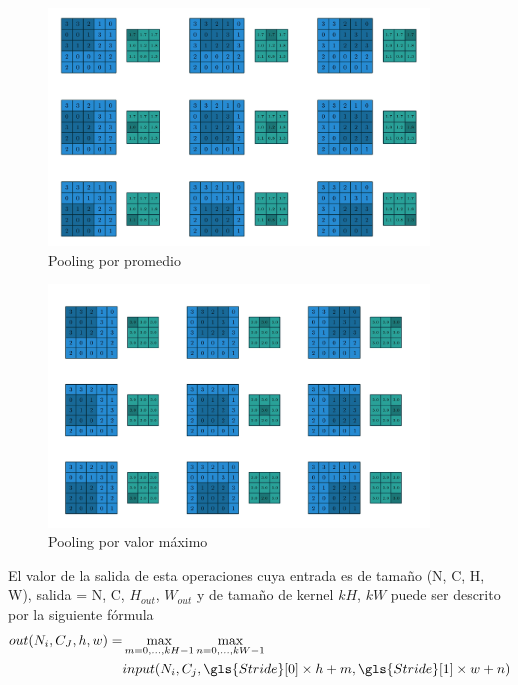 \begin{figure}[H]
    \centering
    \includegraphics[width =0.9\textwidth]{images/convolucion/ima15.jpg}
    \caption{\gls{Pooling} por promedio}
    \label{fig:poolMax}
\end{figure}
\begin{figure}[H]
    \centering
    \includegraphics[width =0.9\textwidth]{images/convolucion/ima16.jpg}
    \caption{\gls{Pooling} por valor máximo}
    \label{fig:poolAverage}
\end{figure}

El valor de la salida de esta operaciones cuya entrada es de tamaño (N, C, H, W), salida = N, C, $H_{out}$, $W_{out}$ y de tamaño de \gls{kernel} $kH$, $kW$ puede ser descrito por la siguiente fórmula
\begin{equation}
\begin{split}
    out(N_i,C_J,h,w)=  &\max_{m=0 ,..., kH-1}\max_{n=0 ,...,kW-1}    \\
    &input(N_i,C_j,\gls{Stride}[0]\times h+m,\gls{Stride}[1]\times w+n)
\end{split}
\end{equation}

